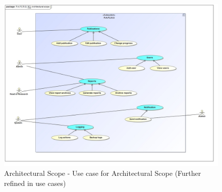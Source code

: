 \documentclass{article}
\begin{document}
		\begin{figure}[H]
			\includegraphics[width=\linewidth]{../../Diagrams/Architectural Scope/Architectural scope.jpg}
			\caption{Architectural Scope - Use case for Architectural Scope (Further refined in use cases)}
		\end{figure}

		\cleardoublepage
		
\end{document}
